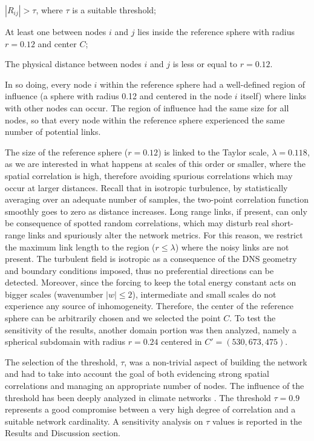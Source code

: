 \documentclass{ws-ijbc}
\begin{document}
\begin{itemlist}
\item $|R_{ij}|>\tau$, where $\tau$ is a suitable threshold;
\item At least one between nodes $i$ and $j$ lies inside the reference sphere with radius $r=0.12$ and center $C$;
\item The physical distance between nodes $i$ and $j$ is less or equal to $r=0.12$.
\end{itemlist}

In so doing, every node $i$ within the reference sphere had a well-defined region of influence (a sphere with radius 0.12 and centered in the node $i$ itself) where links with other nodes can occur. The region of influence had the same size for all nodes, so that every node within the reference sphere experienced the same number of potential links.

\noindent The size of the reference sphere ($r=0.12$) is linked to the Taylor scale, $\lambda=0.118$, as we are interested in what happens at scales of this order or smaller, where the spatial correlation is high, therefore avoiding spurious correlations which may occur at larger distances. Recall that in isotropic turbulence, by statistically averaging over an adequate number of samples, the two-point correlation function smoothly goes to zero as distance increases. Long range links, if present, can only be consequence of spotted random correlations, which may disturb real short-range links and spuriously alter the network metrics. For this reason, we restrict the maximum link length to the region ($r \leq \lambda$) where the noisy links are not present. The turbulent field is isotropic as a consequence of the DNS geometry and boundary conditions imposed, thus no preferential directions can be detected. Moreover, since the forcing to keep the total energy constant acts on bigger scales (wavenumber $|w| \leq 2$), intermediate and small scales do not experience any source of inhomogeneity. Therefore, the center of the reference sphere can be arbitrarily chosen and we selected the point $C$. To test the sensitivity of the results, another domain portion was then analyzed, namely a spherical subdomain with radius $r=0.24$ centered in $C'=(530,673,475)$.

The selection of the threshold, $\tau$, was a non-trivial aspect of building the network and had to take into account the goal of both evidencing strong spatial correlations and managing an appropriate number of nodes. The influence of the threshold has been deeply analyzed in climate networks \cite{Donges_et_al_2009}. The threshold $\tau=0.9$ represents a good compromise between a very high degree of correlation and a suitable network cardinality. A sensitivity analysis on $\tau$ values is reported in the Results and Discussion section.
\end{document}
